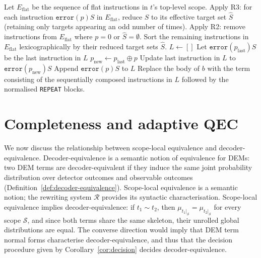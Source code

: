 \documentclass[11pt,a4paper]{article}
\newcommand{\R}{\mathcal{R}}          %
\newcommand{\dist}[1]{\mu_{#1}}   %
\begin{document}
\begin{algorithm}[h]
\caption{DEM Term Normalisation Procedure}\label{alg:norm}
\begin{algorithmic}[1]
    \State Let $E_{\text{flat}}$ be the sequence of flat instructions in $t$'s top-level scope.
    \State Apply R3: for each instruction $\mathtt{error}(p) S$ in $E_{\text{flat}}$, reduce $S$ to its effective target set $\widehat{S}$ (retaining only targets appearing an odd number of times).
    \State Apply R2: remove instructions from $E_{\text{flat}}$ where $p=0$ or $\widehat{S}=\emptyset$.
    \State Sort the remaining instructions in $E_{\text{flat}}$ lexicographically by their reduced target sets $\widehat{S}$.
    \State $L \gets []$
            \State Let $\mathtt{error}(p_{\text{last}}) S$ be the last instruction in $L$
            \State $p_{\text{new}} \gets p_{\text{last}} \oplus p$ 
            \State Update last instruction in $L$ to $\mathtt{error}(p_{\text{new}}) S$
        \Else
            \State Append $\mathtt{error}(p) S$ to $L$
        \EndIf
    \EndFor
        \State Replace the body of $b$ with 
    \EndFor
    \State \Return the term consisting of the sequentially composed instructions in $L$ followed by the normalised \texttt{REPEAT} blocks.
\EndFunction
\end{algorithmic}
\end{algorithm}

\section{Completeness and adaptive QEC}
\label{sec:completeness}

We now discuss the relationship between scope-local equivalence and decoder-equivalence. Decoder-equivalence is a semantic notion of equivalence for DEMs: two DEM terms are decoder-equivalent if they induce the same joint probability distribution over detector outcomes and observable outcomes (Definition~\ref{def:decoder-equivalence}). Scope-local equivalence is a semantic notion; the rewriting system $\R$ provides its syntactic characterisation. Scope-local equivalence implies decoder-equivalence: if $t_1 \sim t_2$, then $\dist{t_1|_{\mathcal{S}}} = \dist{t_2|_{\mathcal{S}}}$ for every scope $\mathcal{S}$, and since both terms share the same skeleton, their unrolled global distributions are equal. The converse direction would imply that DEM term normal forms characterise decoder-equivalence, and thus that the decision procedure given by Corollary~\ref{cor:decision} decides decoder-equivalence.
\end{document}
